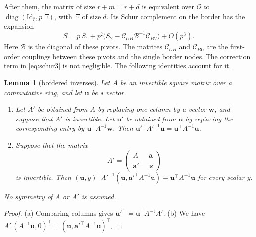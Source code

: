 \documentclass[11pt]{amsart}
\newtheorem{lemma}[theorem]{Lemma}
\theoremstyle{definition}
\theoremstyle{remark}
\numberwithin{equation}{section}
\newcommand{\cO}{\mathcal O}
\newcommand{\Id}{\mathrm{Id}}
\begin{document}
After them, the matrix of size $r+m=\bar r+d$ is equivalent over $\cO$ to $\operatorname{diag}(\Id_{\bar r},p\,\Xi)$,
with $\Xi$ of size $d$. Its Schur complement on the border has the expansion
\begin{equation}\label{eq:schur3}
 S=p\,S_1+p^2\bigl(S_2-\mathcal C_{UB}\mathcal B^{-1}\mathcal C_{BU}\bigr)+O(p^3).
\end{equation}
Here $\mathcal B$ is the diagonal of these pivots. The matrices $\mathcal C_{UB}$ and $\mathcal C_{BU}$ are the
first-order couplings between these pivots and the single border nodes. The correction term in \eqref{eq:schur3} is not
negligible. The following identities account for it.

\begin{lemma}[bordered inverses]\label{lem:bordered}
Let $A$ be an invertible square matrix over a commutative ring, and let $\mathbf u$ be a vector.
\begin{enumerate}[label=(\alph*),leftmargin=*]
\item Let $A'$ be obtained from $A$ by replacing one column by a vector $\mathbf w$, and suppose that $A'$ is invertible.
 Let $\mathbf u'$ be obtained from $\mathbf u$ by replacing the corresponding entry by $\mathbf u^\top A^{-1}\mathbf w$.
 Then $\mathbf u'^{\top}A'^{-1}\mathbf u=\mathbf u^\top A^{-1}\mathbf u$.
\item Suppose that the matrix
 \[
  A'=\begin{pmatrix}A&\mathbf a\\ \mathbf a'^\top&\varkappa\end{pmatrix}
 \]
 is invertible. Then
 $(\mathbf u,y)^\top A'^{-1}(\mathbf u,\mathbf a'^\top A^{-1}\mathbf u)=\mathbf u^\top A^{-1}\mathbf u$ for every
 scalar $y$.
\end{enumerate}
No symmetry of $A$ or $A'$ is assumed.
\end{lemma}
\begin{proof}
(a) Comparing columns gives $\mathbf u'^{\top}=\mathbf u^\top A^{-1}A'$. (b) We have
$A'\,(A^{-1}\mathbf u,0)^\top=(\mathbf u,\mathbf a'^\top A^{-1}\mathbf u)^\top$.
\end{proof}
\end{document}
